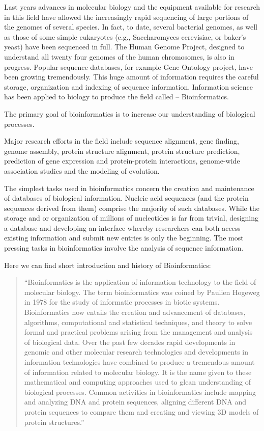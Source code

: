 Last years advances in molecular biology and the equipment available for research in this field have allowed the increasingly rapid sequencing of large portions of the genomes of several species.
In fact, to date, several bacterial genomes, as well as those of some simple eukaryotes (e.g., Saccharomyces cerevisiae, or baker's yeast) have been sequenced in full.
The Human Genome Project, designed to understand all twenty four genomes of the human chromosomes, is also in progress. Popular sequence databases, for example Gene Ontology project, have been growing tremendously.
This huge amount of information requires the careful storage, organization and indexing of sequence information. Information science has been applied to biology to produce the field called -- Bioinformatics.


The primary goal of bioinformatics is to increase our understanding of biological processes.


Major research efforts in the field include sequence alignment, gene finding, genome assembly, protein structure alignment, protein structure prediction, prediction of gene expression and protein-protein interactions, genome-wide association studies and the modeling of evolution.


The simplest tasks used in bioinformatics concern the creation and maintenance of databases of biological information.
Nucleic acid sequences (and the protein sequences derived from them) comprise the majority of such databases. While the storage and or organization of millions of nucleotides is far from trivial,
designing a database and developing an interface whereby researchers can both access existing information and submit new entries is only the beginning.
The most pressing tasks in bioinformatics involve the analysis of sequence information.~\cite{Biology}


Here we can find short introduction and history of Bioinformatics:

\begin{quotation}
``Bioinformatics is the application of information technology to the field of molecular biology.
The term bioinformatics was coined by Paulien Hogeweg in 1978 for the study of informatic processes in biotic systems.
Bioinformatics now entails the creation and advancement of databases, algorithms, computational and statistical techniques, and theory to solve formal and practical problems arising from the management and analysis of biological data.
Over the past few decades rapid developments in genomic and other molecular research technologies and developments in information technologies have combined to produce a tremendous amount of information related to molecular biology.
It is the name given to these mathematical and computing approaches used to glean understanding of biological processes.
Common activities in bioinformatics include mapping and analyzing DNA and protein sequences, aligning different DNA and protein sequences to compare them and creating and viewing 3D models of protein structures.''~\cite{Bioinformatic}
\end{quotation}


